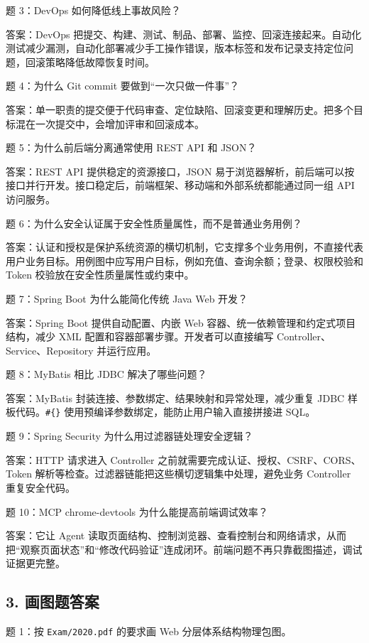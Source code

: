 \documentclass[UTF8,zihao=-4]{ctexart}
\begin{document}
题 3：DevOps 如何降低线上事故风险？

答案：DevOps 把提交、构建、测试、制品、部署、监控、回滚连接起来。自动化测试减少漏测，自动化部署减少手工操作错误，版本标签和发布记录支持定位问题，回滚策略降低故障恢复时间。

题 4：为什么 Git commit 要做到“一次只做一件事”？

答案：单一职责的提交便于代码审查、定位缺陷、回滚变更和理解历史。把多个目标混在一次提交中，会增加评审和回滚成本。

题 5：为什么前后端分离通常使用 REST API 和 JSON？

答案：REST API 提供稳定的资源接口，JSON 易于浏览器解析，前后端可以按接口并行开发。接口稳定后，前端框架、移动端和外部系统都能通过同一组 API 访问服务。

题 6：为什么安全认证属于安全性质量属性，而不是普通业务用例？

答案：认证和授权是保护系统资源的横切机制，它支撑多个业务用例，不直接代表用户业务目标。用例图中应写用户目标，例如充值、查询余额；登录、权限校验和 Token 校验放在安全性质量属性或约束中。

题 7：Spring Boot 为什么能简化传统 Java Web 开发？

答案：Spring Boot 提供自动配置、内嵌 Web 容器、统一依赖管理和约定式项目结构，减少 XML 配置和容器部署步骤。开发者可以直接编写 Controller、Service、Repository 并运行应用。

题 8：MyBatis 相比 JDBC 解决了哪些问题？

答案：MyBatis 封装连接、参数绑定、结果映射和异常处理，减少重复 JDBC 样板代码。\texttt{\#\{\}} 使用预编译参数绑定，能防止用户输入直接拼接进 SQL。

题 9：Spring Security 为什么用过滤器链处理安全逻辑？

答案：HTTP 请求进入 Controller 之前就需要完成认证、授权、CSRF、CORS、Token 解析等检查。过滤器链能把这些横切逻辑集中处理，避免业务 Controller 重复安全代码。

题 10：MCP chrome-devtools 为什么能提高前端调试效率？

答案：它让 Agent 读取页面结构、控制浏览器、查看控制台和网络请求，从而把“观察页面状态”和“修改代码验证”连成闭环。前端问题不再只靠截图描述，调试证据更完整。

\subsection{3. 画图题答案}

题 1：按 \texttt{Exam/2020.pdf} 的要求画 Web 分层体系结构物理包图。
\end{document}
